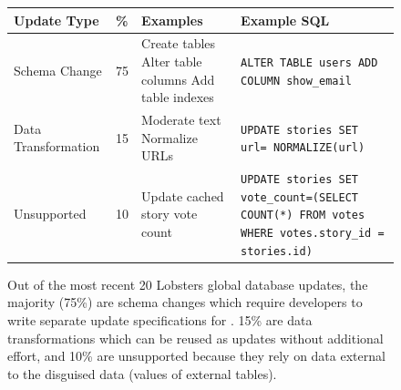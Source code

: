 \begin{figure}
    \centering
    \begin{tabular}{m{}|m{}|m{}|m{}}
        \centering\textbf{Update Type} & \centering\textbf{\%} &
        \centering\textbf{Examples} & \textbf{Example SQL} \\
        \hline
        Schema Change & \begin{center}75\end{center} & Create tables \newline Alter table columns \newline Add table indexes & \texttt{ALTER TABLE users ADD COLUMN show\_email} \\
        \hline
        Data Transformation & \begin{center}15\end{center} & Moderate text \newline Normalize URLs & \texttt{UPDATE stories SET
        url= NORMALIZE(url)} \\
        \hline
            Unsupported & \begin{center}10\end{center} & Update cached story vote count & \texttt{UPDATE stories SET
        vote\_count=(SELECT COUNT(*) FROM votes WHERE votes.story\_id =
        stories.id)} \\
    \end{tabular}
 
    \caption[\sys supports 90\% of Lobster's recent global database updates.]{Out of the most recent 20 Lobsters global database updates,
    the majority (75\%) are schema changes which require developers to write
    separate update specifications for \sys. 15\% are data transformations which can
    be reused as updates without additional effort, and 10\% are unsupported
    because they rely on data external to the disguised data (values of 
    external tables).}
  \label{tab:categories}
\end{figure}

